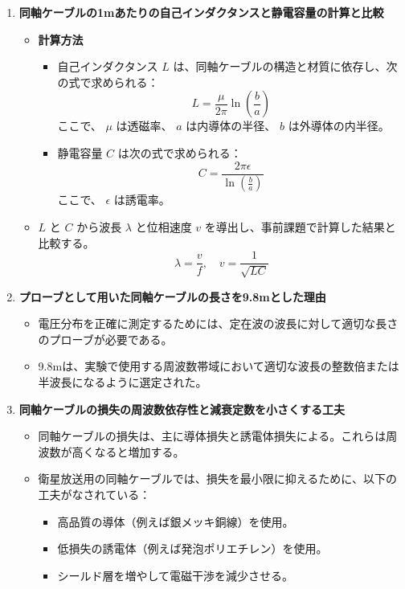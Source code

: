 \documentclass[a4paper,11pt,xelatex,ja=standard]{bxjsarticle}
\begin{document}
\begin{enumerate}
    \item \textbf{同軸ケーブルの1mあたりの自己インダクタンスと静電容量の計算と比較}
    \begin{itemize}
        \item \textbf{計算方法}
        \begin{itemize}
            \item 自己インダクタンス \( L \) は、同軸ケーブルの構造と材質に依存し、次の式で求められる：
            \[
            L = \frac{\mu}{2\pi} \ln \left( \frac{b}{a} \right)
            \]
            ここで、 \( \mu \) は透磁率、 \( a \) は内導体の半径、 \( b \) は外導体の内半径。
            \item 静電容量 \( C \) は次の式で求められる：
            \[
            C = \frac{2\pi \epsilon}{\ln \left( \frac{b}{a} \right)}
            \]
            ここで、 \( \epsilon \) は誘電率。
        \end{itemize}
        \item \( L \) と \( C \) から波長 \( \lambda \) と位相速度 \( v \) を導出し、事前課題で計算した結果と比較する。
        \[
        \lambda = \frac{v}{f}, \quad v = \frac{1}{\sqrt{LC}}
        \]
    \end{itemize}

    \item \textbf{プローブとして用いた同軸ケーブルの長さを9.8mとした理由}
    \begin{itemize}
        \item 電圧分布を正確に測定するためには、定在波の波長に対して適切な長さのプローブが必要である。
        \item 9.8mは、実験で使用する周波数帯域において適切な波長の整数倍または半波長になるように選定された。
    \end{itemize}

    \item \textbf{同軸ケーブルの損失の周波数依存性と減衰定数を小さくする工夫}
    \begin{itemize}
        \item 同軸ケーブルの損失は、主に導体損失と誘電体損失による。これらは周波数が高くなると増加する。
        \item 衛星放送用の同軸ケーブルでは、損失を最小限に抑えるために、以下の工夫がなされている：
        \begin{itemize}
            \item 高品質の導体（例えば銀メッキ銅線）を使用。
            \item 低損失の誘電体（例えば発泡ポリエチレン）を使用。
            \item シールド層を増やして電磁干渉を減少させる。
        \end{itemize}
    \end{itemize}
\end{enumerate}
\end{document}
